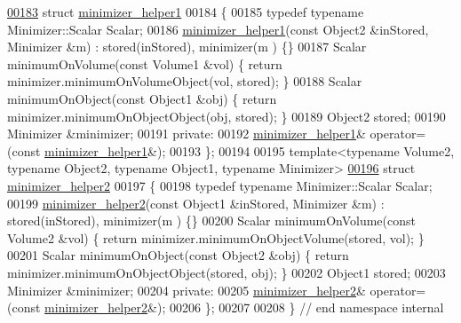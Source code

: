 \begin{DoxyCode}
\hyperlink{struct_eigen_1_1internal_1_1minimizer__helper1}{00183} \textcolor{keyword}{struct }\hyperlink{struct_eigen_1_1internal_1_1minimizer__helper1}{minimizer\_helper1}
00184 \{
00185   \textcolor{keyword}{typedef} \textcolor{keyword}{typename} Minimizer::Scalar Scalar;
00186   \hyperlink{struct_eigen_1_1internal_1_1minimizer__helper1}{minimizer\_helper1}(\textcolor{keyword}{const} Object2 &inStored, Minimizer &m) : stored(inStored), minimizer(m
      ) \{\}
00187   Scalar minimumOnVolume(\textcolor{keyword}{const} Volume1 &vol) \{ \textcolor{keywordflow}{return} minimizer.minimumOnVolumeObject(vol, stored); \}
00188   Scalar minimumOnObject(\textcolor{keyword}{const} Object1 &obj) \{ \textcolor{keywordflow}{return} minimizer.minimumOnObjectObject(obj, stored); \}
00189   Object2 stored;
00190   Minimizer &minimizer;
00191 \textcolor{keyword}{private}:
00192   \hyperlink{struct_eigen_1_1internal_1_1minimizer__helper1}{minimizer\_helper1}& operator=(\textcolor{keyword}{const} \hyperlink{struct_eigen_1_1internal_1_1minimizer__helper1}{minimizer\_helper1}&);
00193 \};
00194 
00195 \textcolor{keyword}{template}<\textcolor{keyword}{typename} Volume2, \textcolor{keyword}{typename} Object2, \textcolor{keyword}{typename} Object1, \textcolor{keyword}{typename} Minimizer>
\hyperlink{struct_eigen_1_1internal_1_1minimizer__helper2}{00196} \textcolor{keyword}{struct }\hyperlink{struct_eigen_1_1internal_1_1minimizer__helper2}{minimizer\_helper2}
00197 \{
00198   \textcolor{keyword}{typedef} \textcolor{keyword}{typename} Minimizer::Scalar Scalar;
00199   \hyperlink{struct_eigen_1_1internal_1_1minimizer__helper2}{minimizer\_helper2}(\textcolor{keyword}{const} Object1 &inStored, Minimizer &m) : stored(inStored), minimizer(m
      ) \{\}
00200   Scalar minimumOnVolume(\textcolor{keyword}{const} Volume2 &vol) \{ \textcolor{keywordflow}{return} minimizer.minimumOnObjectVolume(stored, vol); \}
00201   Scalar minimumOnObject(\textcolor{keyword}{const} Object2 &obj) \{ \textcolor{keywordflow}{return} minimizer.minimumOnObjectObject(stored, obj); \}
00202   Object1 stored;
00203   Minimizer &minimizer;
00204 \textcolor{keyword}{private}:
00205   \hyperlink{struct_eigen_1_1internal_1_1minimizer__helper2}{minimizer\_helper2}& operator=(\textcolor{keyword}{const} \hyperlink{struct_eigen_1_1internal_1_1minimizer__helper2}{minimizer\_helper2}&);
00206 \};
00207 
00208 \} \textcolor{comment}{// end namespace internal}

\end{DoxyCode}
